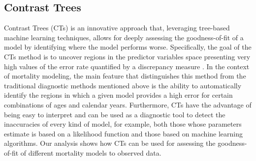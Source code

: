 \documentclass[fleqn,10pt]{wlscirep}
\begin{document}
\subsection*{Contrast Trees}
\color{blue}Contrast Trees (CTs) is an innovative approach that, leveraging tree-based machine learning techniques, allows for deeply assessing the goodness-of-fit of a model by identifying where the model performs worse. \color{black}
Specifically, the goal of the CTs method is to uncover regions in the predictor variables space presenting very high values of the error rate quantified by a discrepancy measure \cite{Friedman2020}. \color{blue}In the context of mortality modeling, the main feature that distinguishes this method from the traditional diagnostic methods mentioned above is the ability to automatically identify the regions in which a given model provides a high error for certain combinations of ages and calendar years.
Furthermore, CTs have the advantage of being easy to interpret and can be used as a diagnostic tool to detect the inaccuracies of every kind of model, for example, both those whose parameters estimate is based on a likelihood function and those based on machine learning algorithms. Our analysis shows how CTs can be used for assessing the goodness-of-fit of different mortality models to observed data. 
\color{black}
\end{document}
